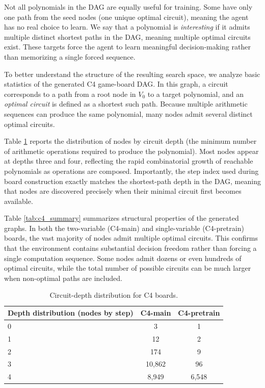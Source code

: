 \documentclass{article} %
\begin{document}
Not all polynomials in the DAG are equally useful for training. Some have only one path from the seed nodes (one unique optimal circuit), meaning the agent has no real choice to learn. We say that a polynomial is \textit{interesting} if it admits multiple distinct shortest paths in the DAG, meaning multiple optimal circuits exist. These targets force the agent to learn meaningful decision-making rather than memorizing a single forced sequence.

To better understand the structure of the resulting search space, we analyze basic statistics of the generated C4 game-board DAG. In this graph, a circuit corresponds to a path from a root node in $V_0$ to a target polynomial, and an \textit{optimal circuit} is defined as a shortest such path. Because multiple arithmetic sequences can produce the same polynomial, many nodes admit several distinct optimal circuits.

Table \ref{tab:c4_depth} reports the distribution of nodes by circuit depth (the minimum number of arithmetic operations required to produce the polynomial). Most nodes appear at depths three and four, reflecting the rapid combinatorial growth of reachable polynomials as operations are composed. Importantly, the step index used during board construction exactly matches the shortest-path depth in the DAG, meaning that nodes are discovered precisely when their minimal circuit first becomes available.

Table \ref{tab:c4_summary} summarizes structural properties of the generated graphs. In both the two-variable (C4-main) and single-variable (C4-pretrain) boards, the vast majority of nodes admit multiple optimal circuits. This confirms that the environment contains substantial decision freedom rather than forcing a single computation sequence. Some nodes admit dozens or even hundreds of optimal circuits, while the total number of possible circuits can be much larger when non-optimal paths are included.


\begin{table}[t]
\centering
\small
\begin{tabular}{lcc}
\toprule
Depth distribution (nodes by step) & C4-main & C4-pretrain \\
\midrule
0 & 3 & 1 \\
1 & 12 & 2 \\
2 & 174 & 9 \\
3 & 10{,}862 & 96 \\
4 & 8{,}949 & 6{,}548 \\
\bottomrule
\end{tabular}
\caption{Circuit-depth distribution for C4 boards.}
\label{tab:c4_depth}
\end{table}
\end{document}
